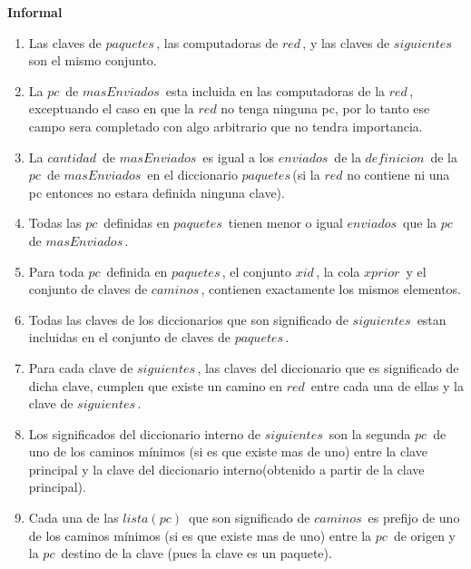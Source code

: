 \disInvarianteDeRepresentacion
\hspace*{\disSubSubSecMargen}\textbf{\textsf{Informal}}
\hspace*{\disSubSubSecMargen}
\begin{enumerate}
\setlength{\itemindent}{3em}
	\item Las claves de $\mathit{paquetes} \,$, las computadoras de $\mathit{red} \,$, y las claves de $\mathit{siguientes} \,$ son el mismo conjunto.
	\item La $\mathit{pc} \,$ de $\mathit{masEnviados} \,$ esta incluida en las computadoras de la $\mathit{red} \,$, exceptuando el caso en que la $red$ no tenga ninguna pc, por lo tanto ese campo sera completado con algo arbitrario que no tendra importancia.
	\item La $\mathit{cantidad} \,$ de $\mathit{masEnviados} \,$ es igual a los $\mathit{enviados} \,$ de la $\mathit{definicion} \,$ de la $\mathit{pc} \,$ de $\mathit{masEnviados} \,$ en el diccionario $\mathit{paquetes} \,$(si la $red$ no contiene ni una pc entonces no estara definida ninguna clave).
	\item Todas las $\mathit{pc}  \,$ definidas en $\mathit{paquetes} \,$ tienen menor o igual $\mathit{enviados} \,$ que la $\mathit{pc} \,$ de $\mathit{masEnviados} \,$.
	\item Para toda $\mathit{pc} \,$ definida en $\mathit{paquetes} \,$, el conjunto $\mathit{xid} \,$, la cola $\mathit{xprior} \,$ y el conjunto de claves de $\mathit{caminos} \,$, contienen exactamente los mismos elementos.
	\item Todas las claves de los diccionarios que son significado de $\mathit{siguientes} \,$ estan incluidas en el conjunto de claves de $\mathit{paquetes} \,$.  
	\item Para cada clave de $\mathit{siguientes} \,$, las claves del diccionario que es significado de dicha clave, cumplen que existe un camino en $\mathit{red} \,$ entre cada una de ellas y la clave de $\mathit{siguientes} \,$.
	\item Los significados del diccionario interno de $\mathit{siguientes} \,$ son la segunda $\mathit{pc} \,$ de uno de los caminos m\'inimos (si es que existe mas de uno) entre la clave principal y la clave del diccionario interno(obtenido a partir de la clave principal).
	\item Cada una de las $\mathit{lista(pc)} \,$ que son significado de $\mathit{caminos} \,$ es prefijo de uno de los caminos m\'inimos (si es que existe mas de uno) entre la $\mathit{pc} \,$ de origen y la $\mathit{pc} \,$ destino de la clave (pues la clave es un paquete).
\end{enumerate} 

